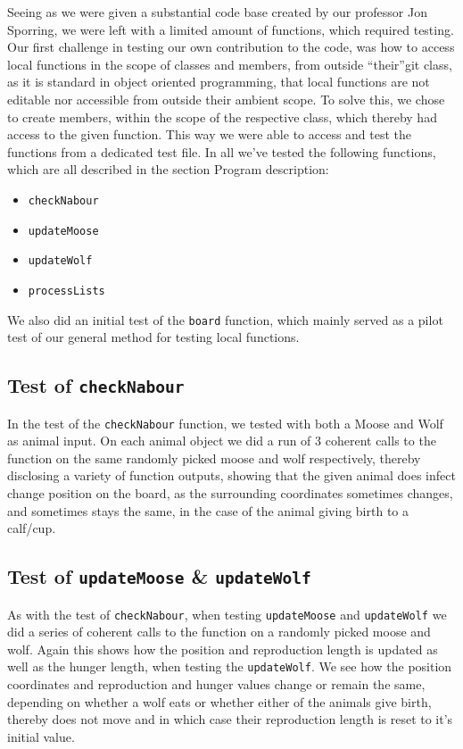 \documentclass[a4paper]{report}
\begin{document}
Seeing as we were given a substantial code base created by our professor Jon Sporring, we were left with a limited amount of functions, which required testing.
Our first challenge in testing our own contribution to the code, was how to access local functions in the scope of classes and members, from outside “their”git  class, as it is standard in object oriented programming, that local functions are not editable nor accessible from outside their ambient scope.
To solve this, we chose to create members, within the scope of the respective class, which thereby had access to the given function. This way we were able to access and test the functions from a dedicated test file.
In all we’ve tested the following functions, which are all described in the section Program description:
\begin{itemize}
\item \texttt{checkNabour}
\item \texttt{updateMoose}
\item \texttt{updateWolf}
\item \texttt{processLists}
\end{itemize}

We also did an initial test of the \texttt{board} function, which mainly served as a pilot test of our general method for testing local functions.

\subsection{Test of \texttt{checkNabour}}
In the test of the \texttt{checkNabour} function, we tested with both a Moose and Wolf as animal input. On each animal object we did a run of 3 coherent calls to the function on the same randomly picked moose and wolf respectively, thereby disclosing a variety of function outputs, showing that the given animal does infect change position on the board, as the surrounding coordinates sometimes changes, and sometimes stays the same, in the case of the animal giving birth to a calf/cup.

\subsection{Test of \texttt{updateMoose} \&  \texttt{updateWolf}}
As with the test of  \texttt{checkNabour}, when testing \texttt{updateMoose} and  \texttt{updateWolf} we did a series of coherent calls to the function on a randomly picked moose and wolf. Again this shows how the position and reproduction length is updated as well as the hunger length, when testing the \texttt{updateWolf}. We see how the position coordinates and reproduction and hunger values change or remain the same, depending on whether a wolf eats or whether either of the animals give birth, thereby does not move and in which case their reproduction length is reset to it’s initial value. 
\end{document}

